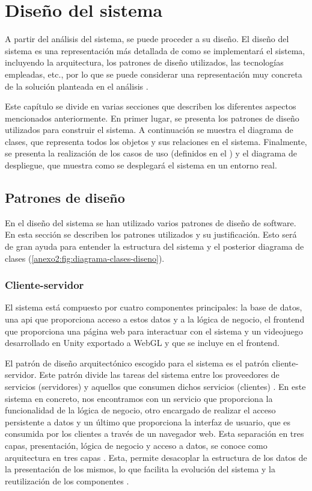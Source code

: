 \chapter{Diseño del sistema}
\label{anexo2:cap:diseno}
A partir del análisis del sistema, se puede proceder a su diseño. El diseño del sistema es una
representación más detallada de como se implementará el sistema, incluyendo la arquitectura,
los patrones de diseño utilizados, las tecnologías empleadas, etc., por lo que se puede considerar
una representación muy concreta de la solución planteada en el análisis \parencite{IBMDesignModel}.

Este capítulo se divide en varias secciones que describen los diferentes aspectos mencionados
anteriormente. En primer lugar, se presenta los patrones de diseño utilizados para
construir el sistema. A continuación se muestra el diagrama de clases, que representa todos los objetos
y sus relaciones en el sistema. Finalmente, se presenta la realización de los casos de uso (definidos
en el \primerAnexo) y el diagrama de despliegue, que muestra como se desplegará
el sistema en un entorno real.

\section{Patrones de diseño}
\label{anexo2:sec:patron-diseno}
En el diseño del sistema se han utilizado varios patrones de diseño de software. En esta sección se
describen los patrones utilizados y su justificación. Esto será de gran ayuda para entender la
estructura del sistema y el posterior diagrama de clases (\ref{anexo2:fig:diagrama-clases-diseno}).

\subsection{Cliente-servidor}
\label{anexo2:subsec:cliente-servidor}
El sistema está compuesto por cuatro componentes principales: la base de datos, una \gls{api} que
proporciona acceso a estos datos y a la lógica de negocio, el \gls{frontend} que proporciona una
página web para interactuar con el sistema y un videojuego desarrollado en Unity exportado a WebGL
y que se incluye en el \gls{frontend}.

El patrón de diseño arquitectónico escogido para el sistema es el patrón
cliente-servidor. Este patrón divide las tareas del sistema entre los
proveedores de servicios (servidores) y aquellos que consumen dichos servicios
(clientes) \parencite{SunDistributedSystems}. En este sistema en concreto, nos
encontramos con un servicio que proporciona la funcionalidad de la lógica de
negocio, otro encargado de realizar el acceso persistente a datos y un último
que proporciona la interfaz de usuario, que es consumida por los clientes a
través de un navegador web. Esta separación en tres capas, presentación, lógica
de negocio y acceso a datos, se conoce como arquitectura en tres capas
\parencites{Ibm2025Apr}. Esta, permite desacoplar la estructura de los datos de
la presentación de los mismos, lo que facilita la evolución del sistema y la
reutilización de los componentes \parencite[p.~3]{nyabuto2024architectural}.

